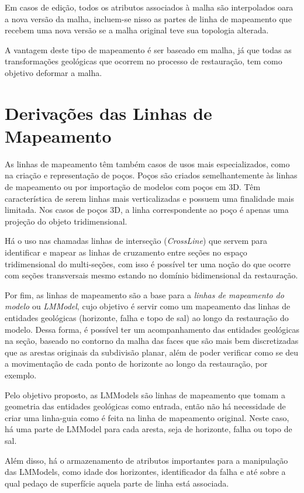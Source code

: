 Em casos de edição, todos os atributos associados à malha são interpolados oara a nova versão da malha, incluem-se nisso as partes de linha de mapeamento que recebem uma nova versão se a malha original teve sua topologia alterada.

A vantagem deste tipo de mapeamento é ser baseado em malha, já que todas as transformações geológicas que ocorrem no processo de restauração, tem como objetivo deformar a malha.

\section{Derivações das Linhas de Mapeamento}

As linhas de mapeamento têm também casos de usos mais especializados, como na criação e representação de poços. Poços são criados semelhantemente às linhas de mapeamento ou por importação de modelos com poços em 3D. Têm característica de serem linhas mais verticalizadas e possuem uma finalidade mais limitada. Nos casos de poços 3D, a linha correspondente ao poço é apenas uma projeção do objeto tridimensional.

Há o uso nas chamadas linhas de interseção (\textit{CrossLine}) que servem para identificar e mapear as linhas de cruzamento entre seções no espaço tridimensional do multi-seções, com isso é possível ter uma noção do que ocorre com seções transversais mesmo estando no domínio bidimensional da restauração.

Por fim, as linhas de mapeamento são a base para a \textit{linhas de mapeamento do modelo} ou \textit{LMModel}, cujo objetivo é servir como um mapeamento das linhas de entidades geológicas (horizonte, falha e topo de sal) ao longo da restauração do modelo. Dessa forma, é possível ter um acompanhamento das entidades geológicas na seção, baseado no contorno da malha das faces que são mais bem discretizadas que as arestas originais da subdivisão planar, além de poder verificar como se deu a movimentação de cada ponto de horizonte ao longo da restauração, por exemplo.

Pelo objetivo proposto, as LMModels são linhas de mapeamento que tomam a geometria das entidades geológicas como entrada, então não há necessidade de criar uma linha-guia como é feita na linha de mapeamento original. Neste caso, há uma parte de LMModel para cada aresta, seja de horizonte, falha ou topo de sal.

Além disso, há o armazenamento de atributos importantes para a manipulação das LMModels, como idade dos horizontes, identificador da falha e até sobre a qual pedaço de superfície aquela parte de linha está associada.

